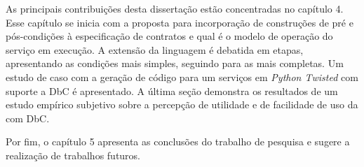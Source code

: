 As principais contribuições desta dissertação estão concentradas no capítulo 4.
Esse capítulo se inicia com a proposta para incorporação de construções de pré e
pós-condições à especificação de contratos e qual é o modelo de operação do
serviço em execução. A extensão da linguagem é debatida em etapas, apresentando
as condições mais simples, seguindo para as mais completas. Um estudo de caso
com a geração de código para um serviços em \textit{Python Twisted} com suporte
a DbC é apresentado. A última seção demonstra os resultados de um estudo
empírico subjetivo sobre a percepção de utilidade e de facilidade de uso da \neoidl{} com DbC.

Por fim, o capítulo 5 apresenta as conclusões do trabalho de pesquisa e sugere a
reali\-zação de trabalhos futuros.
